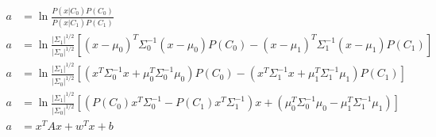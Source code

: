 \documentclass[newpage]{homework}
\begin{document}
\begin{align*}
    a	&=	\ln \frac{P(x|C_0)P(C_0)}{P(x|C_1)P(C_1)}	\\
    a	&=	\ln\frac{|\Sigma_1|^{1/2}}{|\Sigma_0|^{1/2}} \left[(x-\mu_0)^T \Sigma_0^{-1} (x-\mu_0) P(C_0) - (x-\mu_1)^T \Sigma_1^{-1} (x-\mu_1) P(C_1)\right]   \\
    a	&=	\ln\frac{|\Sigma_1|^{1/2}}{|\Sigma_0|^{1/2}} \left[ (x^T\Sigma_0^{-1}x + \mu_0^T \Sigma_0^{-1} \mu_0) P(C_0) - (x^T\Sigma_1^{-1}x + \mu_1^T \Sigma_1^{-1} \mu_1) P(C_1)   \right] \\
    a	&=	\ln\frac{|\Sigma_1|^{1/2}}{|\Sigma_0|^{1/2}} \left[ 
    (P(C_0) x^T\Sigma_0^{-1} - P(C_1)x^T\Sigma_1^{-1}) x + (\mu_0^T \Sigma_0^{-1} \mu_0 - \mu_1^T \Sigma_1^{-1} \mu_1)  \right] \\
    a   &=  \boxed{x^TAx + w^Tx + b}
\end{align*}
\end{document}
